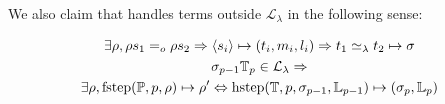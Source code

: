 \documentclass[sigconf,natbib=false,review]{acmart}
\newcommand{\EqualRel}{\ensuremath{=}}
\newcommand{\UnifRel}{\ensuremath{\simeq}}
\newcommand{\Uo}{\ensuremath{\UnifRel_o}\xspace}
\newcommand{\Eo}{\ensuremath{\EqualRel_o}\xspace}
\newcommand{\Ue}{\ensuremath{\UnifRel_\lambda}\xspace}
\newcommand{\llambda}{\ensuremath{\mathcal{L}_\lambda}\xspace}
\newcommand{\linkStore}{\ensuremath{\mathbb{L}}\xspace}
\newcommand{\foUnifPb}{\ensuremath{\mathbb{P}}\xspace}
\newcommand{\hoUnifPb}{\ensuremath{\mathbb{T}}\xspace}
\begin{document}





We also claim that \hrun
handles terms outside \llambda in the following sense:

\begin{proposition}
\begin{gather}
  \exists \rho, \rho s_1 \Eo \rho s_2 \Rightarrow
  \C{s_i}{t_i}{m_i}{l_i} \Rightarrow
  t_1 \Ue t_2 \mapsto \sigma \label{prop:compilation-nllam}\\
  \sigma_{p-1} \hoUnifPb_{p} \in \llambda \Rightarrow \label{prop:step-nllam}\\
  \exists \rho,\stepF{\foUnifPb}{p}{\rho}{\rho'} \Leftrightarrow
  \stepH{\hoUnifPb}{p}{\sigma_{p-1}}{\linkStore_{p-1}}{\sigma_{p}}{\linkStore_p} \nonumber
\end{gather}
\end{proposition}
\end{document}
